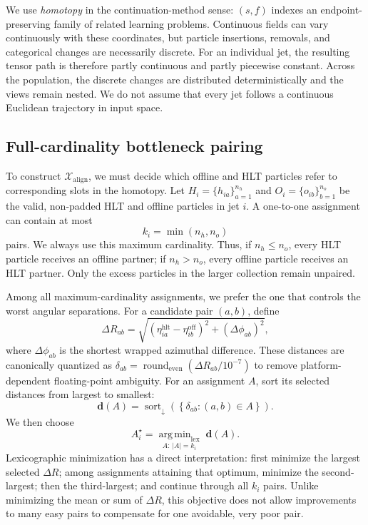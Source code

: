 \documentclass[11pt]{article}
\newcommand{\xalign}{\mathcal{X}_{\mathrm{align}}}
\begin{document}
We use \emph{homotopy} in the continuation-method sense: $(s,f)$ indexes an
endpoint-preserving family of related learning problems.  Continuous fields
can vary continuously with these coordinates, but particle insertions,
removals, and categorical changes are necessarily discrete.  For an
individual jet, the resulting tensor path is therefore partly continuous and
partly piecewise constant.  Across the population, the discrete changes are
distributed deterministically and the views remain nested.  We do not assume
that every jet follows a continuous Euclidean trajectory in input space.

\subsection{Full-cardinality bottleneck pairing}

To construct $\xalign$, we must decide which offline and HLT particles refer
to corresponding slots in the homotopy.  Let
$H_i=\{h_{ia}\}_{a=1}^{n_h}$ and
$O_i=\{o_{ib}\}_{b=1}^{n_o}$ be the valid, non-padded HLT and offline
particles in jet $i$.  A one-to-one assignment can contain at most
\begin{equation}
    k_i=\min(n_h,n_o)
    \label{eq:pairing-cardinality}
\end{equation}
pairs.  We always use this maximum cardinality.  Thus, if $n_h\leq n_o$,
every HLT particle receives an offline partner; if $n_h>n_o$, every offline
particle receives an HLT partner.  Only the excess particles in the larger
collection remain unpaired.

Among all maximum-cardinality assignments, we prefer the one that controls
the worst angular separations.  For a candidate pair $(a,b)$, define
\begin{equation}
    \Delta R_{ab}
      = \sqrt{(\eta_{ia}^{\mathrm{hlt}}-\eta_{ib}^{\mathrm{off}})^2
        +(\Delta\phi_{ab})^2},
    \label{eq:pair-delta-r}
\end{equation}
where $\Delta\phi_{ab}$ is the shortest wrapped azimuthal difference.  These
distances are canonically quantized as
$\delta_{ab}=\operatorname{round}_{\mathrm{even}}(\Delta R_{ab}/10^{-7})$
to remove platform-dependent floating-point ambiguity.  For an assignment
$A$, sort its selected distances from largest to smallest:
\begin{equation}
    \bm d(A)
      = \operatorname{sort}_{\downarrow}
        \left(\left\{\delta_{ab}:(a,b)\in A\right\}\right).
    \label{eq:bottleneck-vector}
\end{equation}
We then choose
\begin{equation}
    A_i^{\star}
      = \underset{A:\,|A|=k_i}{\operatorname{arg\,min}_{\mathrm{lex}}}
        \;\bm d(A).
    \label{eq:bottleneck-assignment}
\end{equation}
Lexicographic minimization has a direct interpretation: first minimize the
largest selected $\Delta R$; among assignments attaining that optimum,
minimize the second-largest; then the third-largest; and continue through all
$k_i$ pairs.  Unlike minimizing the mean or sum of $\Delta R$, this objective
does not allow improvements to many easy pairs to compensate for one
avoidable, very poor pair.
\end{document}
